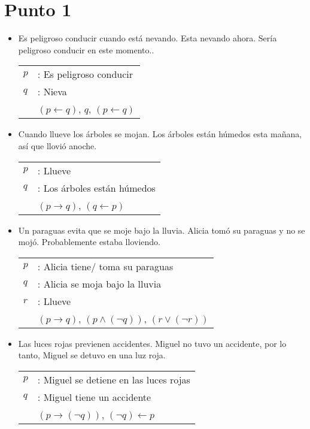 \documentclass{article}
\begin{document}
\section{Punto 1}
\begin{itemize}
	\item Es peligroso conducir cuando está nevando. Esta nevando ahora. Sería peligroso conducir en este momento..
	      \begin{center}
		      \begin{NiceTabular}{l l}
			      $p$ & : Es peligroso conducir           \\
			      $q$ & : Nieva                           \\
			      \hline
			          & $(p \gets q)$, $q$, $(p \gets q)$
		      \end{NiceTabular}
	      \end{center}
	\item Cuando llueve los árboles se mojan. Los árboles están húmedos esta mañana, así que llovió anoche.
	      \begin{center}
		      \begin{NiceTabular}{l l}
			      $p$ & : Llueve                    \\
			      $q$ & : Los árboles están húmedos \\
			      \hline
			          & $(p \to q)$, $(q \gets p)$
		      \end{NiceTabular}
	      \end{center}
	\item Un paraguas evita que se moje bajo la lluvia. Alicia tomó su paraguas y no se mojó. Probablemente estaba lloviendo.
	      \begin{center}
		      \begin{NiceTabular}{l l}
			      $p$ & : Alicia tiene/ toma su paraguas                          \\
			      $q$ & : Alicia se moja bajo la lluvia                           \\
			      $r$ & : Llueve                                                  \\
			      \hline
			          & $(p \to q)$, $(p \wedge (\lnot q))$, $(r \vee (\lnot r))$
		      \end{NiceTabular}
	      \end{center}
	\item Las luces rojas previenen accidentes. Miguel no tuvo un accidente, por lo tanto, Miguel se detuvo en una luz roja.
	      \begin{center}
		      \begin{NiceTabular}{l l}
			      $p$ & : Miguel se detiene en las luces rojas   \\
			      $q$ & : Miguel tiene un accidente              \\
			      \hline
			          & $(p \to (\lnot q))$, $(\lnot q) \gets p$
		      \end{NiceTabular}
	      \end{center}
\end{itemize}
\end{document}
